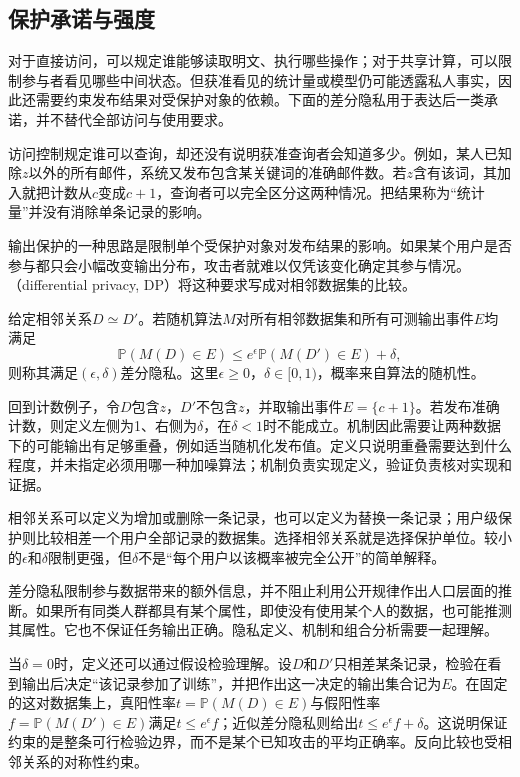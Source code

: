 \subsection{保护承诺与强度}
\label{sec:privacy-guarantees}

对于直接访问，可以规定谁能够读取明文、执行哪些操作；对于共享计算，可以限制参与者看见哪些中间状态。但获准看见的统计量或模型仍可能透露私人事实，因此还需要约束发布结果对受保护对象的依赖。下面的差分隐私用于表达后一类承诺，并不替代全部访问与使用要求。

访问控制规定谁可以查询，却还没有说明获准查询者会知道多少。例如，某人已知除$z$以外的所有邮件，系统又发布包含某关键词的准确邮件数。若$z$含有该词，其加入就把计数从$c$变成$c+1$，查询者可以完全区分这两种情况。把结果称为“统计量”并没有消除单条记录的影响。

输出保护的一种思路是限制单个受保护对象对发布结果的影响。如果某个用户是否参与都只会小幅改变输出分布，攻击者就难以仅凭该变化确定其参与情况。（differential privacy, DP）将这种要求写成对相邻数据集的比较。

\begin{definition}[差分隐私]
\label{def:privacy-dp}
给定相邻关系$D\simeq D'$。若随机算法$M$对所有相邻数据集和所有可测输出事件$E$均满足
\begin{equation}
 \mathbb P(M(D)\in E)
 \leq e^\epsilon\mathbb P(M(D')\in E)+\delta,
 \label{eq:privacy-definition}
\end{equation}
则称其满足$(\epsilon,\delta)$差分隐私。这里$\epsilon\geq0$，$\delta\in[0,1)$，概率来自算法的随机性。
\end{definition}

回到计数例子，令$D$包含$z$，$D'$不包含$z$，并取输出事件$E=\{c+1\}$。若发布准确计数，则定义左侧为1、右侧为$\delta$，在$\delta<1$时不能成立。机制因此需要让两种数据下的可能输出有足够重叠，例如适当随机化发布值。定义只说明重叠需要达到什么程度，并未指定必须用哪一种加噪算法；机制负责实现定义，验证负责核对实现和证据。

相邻关系可以定义为增加或删除一条记录，也可以定义为替换一条记录；用户级保护则比较相差一个用户全部记录的数据集。选择相邻关系就是选择保护单位。较小的$\epsilon$和$\delta$限制更强，但$\delta$不是“每个用户以该概率被完全公开”的简单解释。

差分隐私限制参与数据带来的额外信息，并不阻止利用公开规律作出人口层面的推断。如果所有同类人群都具有某个属性，即使没有使用某个人的数据，也可能推测其属性。它也不保证任务输出正确。隐私定义、机制和组合分析需要一起理解。

当$\delta=0$时，定义还可以通过假设检验理解。设$D$和$D'$只相差某条记录，检验在看到输出后决定“该记录参加了训练”，并把作出这一决定的输出集合记为$E$。在固定的这对数据集上，真阳性率$t=\mathbb P(M(D)\in E)$与假阳性率$f=\mathbb P(M(D')\in E)$满足$t\leq e^\epsilon f$；近似差分隐私则给出$t\leq e^\epsilon f+\delta$。这说明保证约束的是整条可行检验边界，而不是某个已知攻击的平均正确率。反向比较也受相邻关系的对称性约束。

